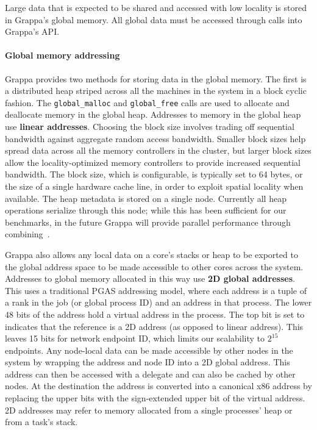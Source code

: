 Large data that is expected to be shared and accessed with low locality is stored in Grappa's global memory. All global data must be accessed through calls into Grappa's API. %

\paragraph{Global memory addressing} Grappa provides two methods for storing data in the global memory. The first is a distributed heap striped across all the machines in the system in a block cyclic fashion. The \texttt{global\_malloc} and \texttt{global\_free} calls are used to allocate and deallocate memory in the global heap.  Addresses to memory in the global heap use \textbf{linear addresses}.  Choosing the block size involves trading off sequential bandwidth against aggregate random access bandwidth. Smaller block sizes help spread data across all the memory controllers in the cluster, but larger block sizes allow the locality-optimized memory controllers to provide increased sequential bandwidth. The block size, which is configurable, is typically set to 64 bytes, or the size of a single hardware cache line, in order to exploit spatial locality when available. The heap metadata is stored on a single node. Currently all heap operations serialize through this node; while this has been sufficient for our benchmarks, in the future Grappa will provide parallel performance through combining~\cite{MAMA,flatcombining}.

Grappa also allows any local data on a core's stacks or heap to be exported to the global address space to be made accessible to other cores across the system. Addresses to global memory allocated in this way use \textbf{2D global addresses}.  This uses a traditional PGAS addressing model, where each address is a tuple of a rank in the job (or global process ID) and an address in that process. The lower 48 bits of the address hold a virtual address in the process. The top bit is set to indicates that the reference is a 2D address (as opposed to linear address). This leaves 15 bits for network endpoint ID, which limits our scalability to $2^{15}$ endpoints. Any node-local data can be made accessible by other nodes in the system by wrapping the address and node ID into a 2D global address. This address can then be accessed with a delegate and can also be cached by other nodes. At the destination the address is converted into a canonical x86 address by replacing the upper bits with the sign-extended upper bit of the virtual address. 2D addresses may refer to memory allocated from a single processes' heap or from a task's stack.

